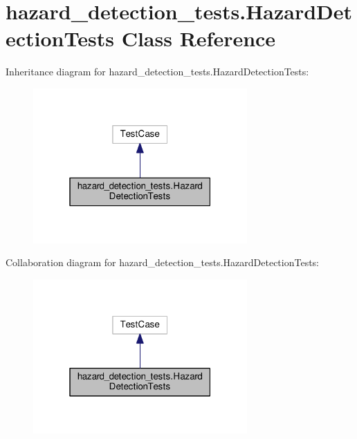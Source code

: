 \hypertarget{classhazard__detection__tests_1_1HazardDetectionTests}{\section{hazard\-\_\-detection\-\_\-tests.\-Hazard\-Detection\-Tests Class Reference}
\label{classhazard__detection__tests_1_1HazardDetectionTests}
}


Inheritance diagram for hazard\-\_\-detection\-\_\-tests.\-Hazard\-Detection\-Tests\-:
\nopagebreak
\begin{figure}[H]
\begin{center}
\leavevmode
\includegraphics[width=232pt]{classhazard__detection__tests_1_1HazardDetectionTests__inherit__graph}
\end{center}
\end{figure}


Collaboration diagram for hazard\-\_\-detection\-\_\-tests.\-Hazard\-Detection\-Tests\-:
\nopagebreak
\begin{figure}[H]
\begin{center}
\leavevmode
\includegraphics[width=232pt]{classhazard__detection__tests_1_1HazardDetectionTests__coll__graph}
\end{center}
\end{figure}
